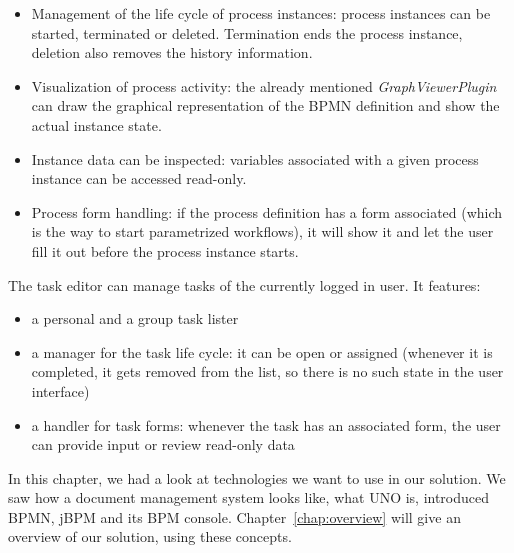 \begin{itemize}
\item Management of the life cycle of process instances: process instances can
be started, terminated or deleted. Termination ends the process instance,
deletion also removes the history information.
\item Visualization of process activity: the already mentioned
\emph{GraphViewerPlugin} can draw the graphical representation of the BPMN
definition and show the actual instance state.
\item Instance data can be inspected: variables associated with a given process
instance can be accessed read-only.
\item Process form handling: if the process definition has a form associated
(which is the way to start parametrized workflows), it will show it and let
the user fill it out before the process instance starts.
\end{itemize}

The task editor can manage tasks of the currently logged in user. It features:

\begin{itemize}
\item a personal and a group task lister
\item a manager for the task life cycle: it can be open or assigned (whenever it is completed, it gets removed from the list, so there is no such state in the user interface)
\item a handler for task forms: whenever the task has an associated form, the user can provide input or review read-only data
\end{itemize}

In this chapter, we had a look at technologies we want to use in our solution.
We saw how a document management system looks like, what UNO is, introduced
BPMN, jBPM and its BPM console. Chapter~\ref{chap:overview} will give an
overview of our solution, using these concepts.
